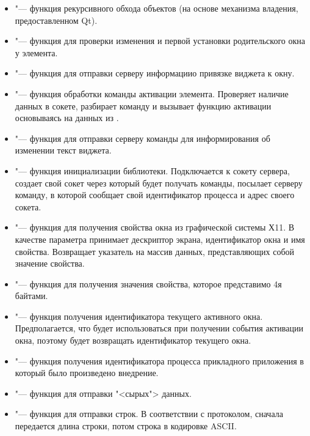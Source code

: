 \begin{itemize}
	\item {} "--- функция рекурсивного обхода
	объектов (на основе механизма владения, предоставленном Qt).
	\item {} "--- функция для проверки изменения и первой 
	установки родительского окна у элемента.
	\item {} "--- функция для отправки серверу 
	информациио привязке виджета к окну.

	\item {} "--- функция обработки команды активации 
	элемента. Проверяет наличие данных в сокете, разбирает команду и вызывает функцию активации основываясь на данных из .
	
	\item {} "--- функция для отправки серверу команды
	для информирования об изменении текст виджета.
	\item {} "--- функция инициализации библиотеки. Подключается
	к сокету сервера, создает свой сокет через который будет получать команды, 
	посылает серверу команду, в которой сообщает свой идентификатор процесса
	и адрес своего сокета.
	
	\item {} "--- функция для получения свойства окна из
	графической системы Х11. В качестве параметра принимает дескриптор экрана,
	идентификатор окна и имя свойства. Возвращает указатель на массив данных,
	представляющих собой значение свойства.
	\item {} "--- функция для получения значения свойства,
	которое представимо 4я байтами.

	\item {} "--- функция получения идентификатора текущего
	активного окна. Предполагается, что будет использоваться при получении
	события активации окна, поэтому будет возвращать идентификатор текущего окна.
	\item {} "--- функция получения идентификатора процесса
	прикладного приложения в который было произведено внедрение.

	\item {} "--- функция для отправки "<сырых"> данных.
	\item {} "--- функция для отправки строк. В соответствии с
	протоколом, сначала передается длина строки, потом строка в кодировке
	ASCII.
\end{itemize}
